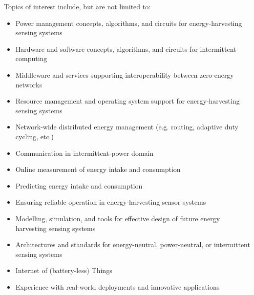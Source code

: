 \documentclass[a4paper,10pt]{scrartcl}
\begin{document}
\begin{minipage}{.49\textwidth}
  Topics of interest include, but are not limited to:
  \vskip1mm
  \begin{itemize}[leftmargin=5mm,nolistsep]
    \item Power management concepts, algorithms, and circuits for energy-harvesting sensing systems
    \item Hardware and software concepts, algorithms, and circuits for intermittent computing
    \item Middleware and services supporting interoperability between zero-energy networks
    \item Resource management and operating system support for energy-harvesting sensing systems
    \item Network-wide distributed energy management (e.g. routing, adaptive duty cycling, etc.)
    \item Communication in intermittent-power domain
    \item Online measurement of energy intake and consumption
    \item Predicting energy intake and consumption
    \item Ensuring reliable operation in energy-harvesting sensor systems
    \item Modelling, simulation, and tools for effective design of future energy harvesting sensing systems 
    \item Architectures and standards for energy-neutral, power-neutral, or intermittent sensing systems
    \item Internet of (battery-less) Things
    \item Experience with real-world deployments and innovative applications
  \end{itemize}
\end{minipage}
\end{document}
